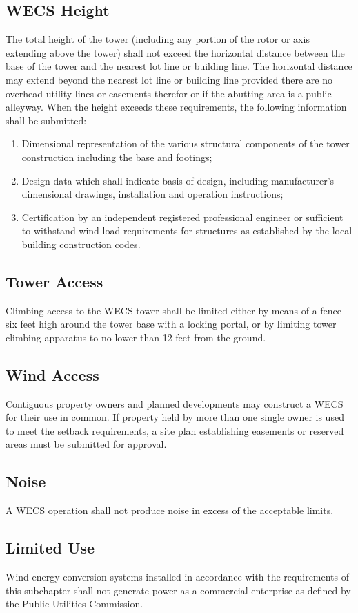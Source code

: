 \subsection{WECS Height}
The total height of the tower (including any portion of the rotor or axis extending above the tower) shall not exceed the horizontal distance between the base of the tower and the nearest lot line or building line. The horizontal distance may extend beyond the nearest lot line or building line provided there are no overhead utility lines or easements therefor or if the abutting area is a public alleyway. When the height exceeds these requirements, the following information shall be submitted:
\begin{enumerate}[{\indent}1)]
    \item Dimensional representation of the various structural components of the tower construction including the base and footings;
    \item Design data which shall indicate basis of design, including manufacturer’s dimensional drawings, installation and operation instructions;
    \item Certification by an independent registered professional engineer or sufficient to withstand wind load requirements for structures as established by the local building construction codes.
\end{enumerate}
\subsection{Tower Access}
Climbing access to the WECS tower shall be limited either by means of a fence six feet high around the tower base with a locking portal, or by limiting tower climbing apparatus to no lower than 12 feet from the ground.
\subsection{Wind Access}
Contiguous property owners and planned developments may construct a WECS for their use in common. If property held by more than one single owner is used to meet the setback requirements, a site plan establishing easements or reserved areas must be submitted for approval.
\subsection{Noise}
A WECS operation shall not produce noise in excess of the acceptable limits.
\subsection{Limited Use}
Wind energy conversion systems installed in accordance with the requirements of this subchapter shall not generate power as a commercial enterprise as defined by the Public Utilities Commission.
